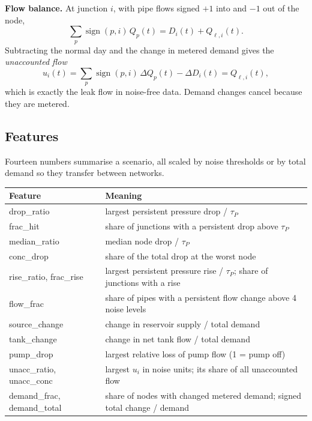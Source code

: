 \documentclass[11pt,a4paper]{article}
\begin{document}
\textbf{Flow balance.} At junction $i$, with pipe flows signed $+1$ into and $-1$ out of the node,
\begin{equation}\sum_p \operatorname{sign}(p,i)\,Q_p(t)=D_i(t)+Q_{\ell,i}(t).\end{equation}
Subtracting the normal day and the change in metered demand gives the \emph{unaccounted flow}
\begin{equation}u_i(t)=\sum_p\operatorname{sign}(p,i)\,\Delta Q_p(t)-\Delta D_i(t)=Q_{\ell,i}(t),\label{eq:unaccounted}\end{equation}
which is exactly the leak flow in noise-free data. Demand changes cancel because they are metered.

\subsection{Features}
Fourteen numbers summarise a scenario, all scaled by noise thresholds or by total demand so they transfer between networks.
\begin{center}\small\begin{tabularx}{\linewidth}{@{}>{\ttfamily}p{2.9cm}Y@{}}\toprule
Feature & Meaning \\\midrule
drop\_ratio & largest persistent pressure drop / $\tau_P$ \\
frac\_hit & share of junctions with a persistent drop above $\tau_P$ \\
median\_ratio & median node drop / $\tau_P$ \\
conc\_drop & share of the total drop at the worst node \\
rise\_ratio, frac\_rise & largest persistent pressure rise / $\tau_P$; share of junctions with a rise \\
flow\_frac & share of pipes with a persistent flow change above 4 noise levels \\
source\_change & change in reservoir supply / total demand \\
tank\_change & change in net tank flow / total demand \\
pump\_drop & largest relative loss of pump flow (1 = pump off) \\
unacc\_ratio, unacc\_conc & largest $u_i$ in noise units; its share of all unaccounted flow \\
demand\_frac, demand\_total & share of nodes with changed metered demand; signed total change / demand \\\bottomrule\end{tabularx}\end{center}
\end{document}
